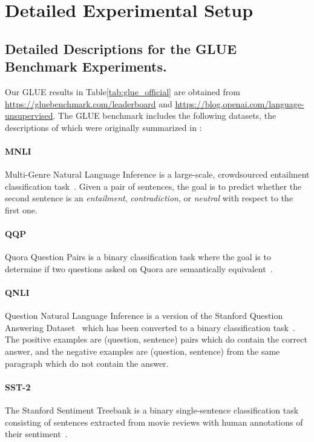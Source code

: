 \section{Detailed Experimental Setup}
\label{appendix:sec:exp_details}

\subsection{Detailed Descriptions for the GLUE Benchmark Experiments.}
\label{appendix:sec:glue}

Our GLUE results in Table\ref{tab:glue_official} are obtained from  \url{https://gluebenchmark.com/leaderboard} and \url{https://blog.openai.com/language-unsupervised}.
The GLUE benchmark includes the following datasets, the descriptions of which were originally summarized in \citet{wang-etal:2018:_glue}:

\paragraph{MNLI} Multi-Genre Natural Language Inference is a large-scale, crowdsourced entailment classification task~\cite{williams-nangia-bowman:2018}. Given a pair of sentences, the goal is to predict whether the second sentence is an {\it entailment}, {\it contradiction}, or {\it neutral} with respect to the first one.

\paragraph{QQP} Quora Question Pairs is a binary classification task where the goal is to determine if two questions asked on Quora are semantically equivalent~\cite{chen-etal:2018:_quora}.

\paragraph{QNLI} Question Natural Language Inference is a version of the Stanford Question Answering Dataset~\cite{rajpurkar-etal:2016:_squad} which has been converted to a binary classification task~\cite{wang-etal:2018:_glue}. The positive examples are (question, sentence) pairs which do contain the correct answer, and the negative examples are (question, sentence) from the same paragraph which do not contain the answer.

\paragraph{SST-2} The Stanford Sentiment Treebank is a binary single-sentence classification task consisting of sentences extracted from movie reviews with human annotations of their sentiment~\cite{socher-etal:2013:_recur}.

